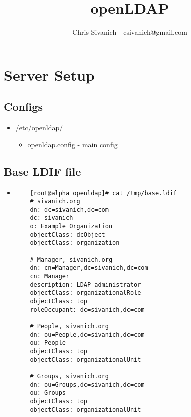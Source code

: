 \documentclass{article}
\title{openLDAP}
\author{Chris Sivanich - csivanich@gmail.com}
\begin{document}
\maketitle
\section{Server Setup}
\subsection{Configs}
\begin{itemize}
    \item /etc/openldap/
        \begin{itemize}
            \item openldap.config - main config
        \end{itemize}
\end{itemize}

\subsection{Base LDIF file}
\begin{itemize}
    \item 
        \begin{verbatim}
    [root@alpha openldap]# cat /tmp/base.ldif
    # sivanich.org
    dn: dc=sivanich,dc=com
    dc: sivanich
    o: Example Organization
    objectClass: dcObject
    objectClass: organization

    # Manager, sivanich.org
    dn: cn=Manager,dc=sivanich,dc=com
    cn: Manager
    description: LDAP administrator
    objectClass: organizationalRole
    objectClass: top
    roleOccupant: dc=sivanich,dc=com

    # People, sivanich.org
    dn: ou=People,dc=sivanich,dc=com
    ou: People
    objectClass: top
    objectClass: organizationalUnit

    # Groups, sivanich.org
    dn: ou=Groups,dc=sivanich,dc=com
    ou: Groups
    objectClass: top
    objectClass: organizationalUnit

    \end{verbatim}
    \end{itemize}
\end{document}
